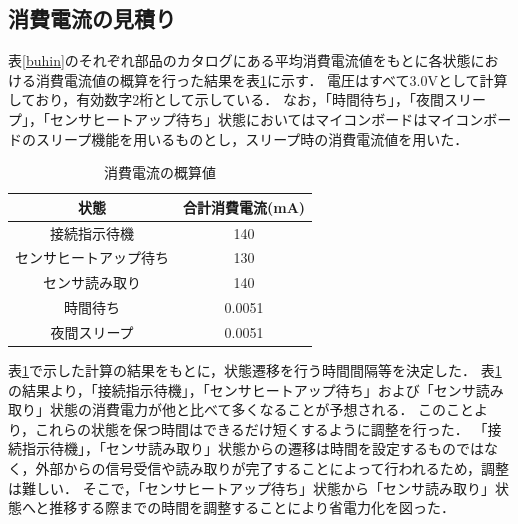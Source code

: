 \subsection*{消費電流の見積り}
表\ref{buhin}のそれぞれ部品のカタログにある平均消費電流値をもとに各状態における消費電流値の概算を行った結果を表\ref{w_risou}に示す．
電圧はすべて3.0Vとして計算しており，有効数字2桁として示している．
なお，「時間待ち」，「夜間スリープ」，「センサヒートアップ待ち」状態においてはマイコンボードはマイコンボードのスリープ機能を用いるものとし，スリープ時の消費電流値を用いた．
\begin{table}[htb]
    \begin{center}
    \caption{消費電流の概算値}
    \begin{tabular}{|c|c|} \hline
状態 &  合計消費電流(mA) \\ \hline \hline
接続指示待機 & 140 \\
センサヒートアップ待ち & 130 \\
センサ読み取り & 140 \\
時間待ち & 0.0051\\
夜間スリープ & 0.0051 \\ \hline
    \end{tabular}
    \label{w_risou}
    \end{center}
\end{table}

表\ref{w_risou}で示した計算の結果をもとに，状態遷移を行う時間間隔等を決定した．
表\ref{w_risou}の結果より，「接続指示待機」，「センサヒートアップ待ち」および「センサ読み取り」状態の消費電力が他と比べて多くなることが予想される．
このことより，これらの状態を保つ時間はできるだけ短くするように調整を行った．
「接続指示待機」，「センサ読み取り」状態からの遷移は時間を設定するものではなく，外部からの信号受信や読み取りが完了することによって行われるため，調整は難しい．
そこで，「センサヒートアップ待ち」状態から「センサ読み取り」状態へと推移する際までの時間を調整することにより省電力化を図った．

